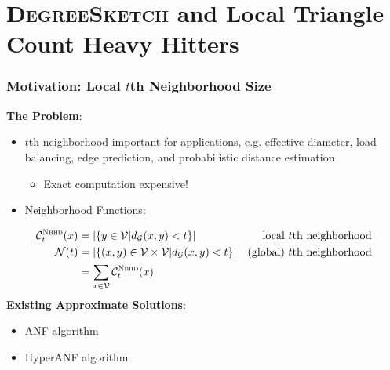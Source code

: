 \documentclass{beamer}
\newcommand{\algoname}[1]{\textnormal{\textsc{#1}}}
\begin{document}
\section{\algoname{DegreeSketch} and Local Triangle Count Heavy Hitters}



\begin{frame}
\frametitle{Motivation: Local $t$th Neighborhood Size}

\textbf{The Problem}:
\begin{itemize}
	\item $t$th neighborhood important for applications, e.g. effective diameter, load balancing, edge prediction, and probabilistic distance estimation
	\begin{itemize}
		\item Exact computation expensive!
	\end{itemize}
	\item Neighborhood Functions:
\end{itemize}
%
\vspace{-0.5em}
\begin{align*}
	\mathcal{C}^{\algoname{Nbhd}}_t(x) 
	&= |\{y \in \mathcal{V} | d_\mathcal{G}(x, y) < t\}| 
	& \textnormal{local $t$th neighborhood} \\
	\mathcal{N}(t)  
	&=  |\{(x, y) \in \mathcal{V} \times \mathcal{V} | d_\mathcal{G}(x, y) < t\}|
	& \textnormal{(global) $t$th neighborhood}  \\
	&= \sum_{x \in \mathcal{V}} \mathcal{C}^{\algoname{Nbhd}}_t(x)  &
\end{align*}
%
\textbf{Existing Approximate Solutions}:
\begin{itemize}
	\item ANF algorithm \cite{palmer2002anf}
	\item HyperANF algorithm \cite{boldi2011hyperanf}
\end{itemize}


\end{frame}
\end{document}
